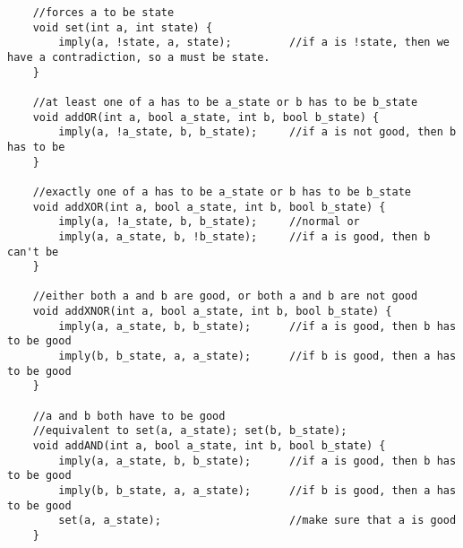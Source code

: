 \documentclass[8pt, headheight=10pt]{scrartcl}
\begin{document}
\begin{multicols*}{3}
\begin{lstlisting}
    //forces a to be state
    void set(int a, int state) {
        imply(a, !state, a, state);         //if a is !state, then we have a contradiction, so a must be state. 
    }

    //at least one of a has to be a_state or b has to be b_state
    void addOR(int a, bool a_state, int b, bool b_state) {
        imply(a, !a_state, b, b_state);     //if a is not good, then b has to be
    }

    //exactly one of a has to be a_state or b has to be b_state
    void addXOR(int a, bool a_state, int b, bool b_state) {
        imply(a, !a_state, b, b_state);     //normal or
        imply(a, a_state, b, !b_state);     //if a is good, then b can't be
    }

    //either both a and b are good, or both a and b are not good
    void addXNOR(int a, bool a_state, int b, bool b_state) {
        imply(a, a_state, b, b_state);      //if a is good, then b has to be good
        imply(b, b_state, a, a_state);      //if b is good, then a has to be good
    }

    //a and b both have to be good
    //equivalent to set(a, a_state); set(b, b_state);
    void addAND(int a, bool a_state, int b, bool b_state) {
        imply(a, a_state, b, b_state);      //if a is good, then b has to be good
        imply(b, b_state, a, a_state);      //if b is good, then a has to be good
        set(a, a_state);                    //make sure that a is good
    }


\end{lstlisting}
\end{multicols*}
\end{document}
